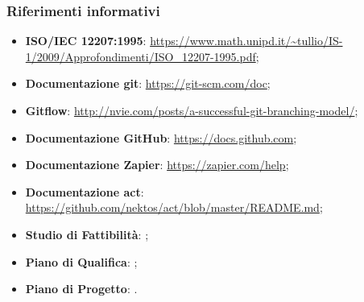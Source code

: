 	\subsubsection{Riferimenti informativi}
	\begin{itemize}
		\item \textbf{ISO/IEC 12207:1995}: \url{https://www.math.unipd.it/~tullio/IS-1/2009/Approfondimenti/ISO_12207-1995.pdf};
		\item \textbf{Documentazione git}: \url{https://git-scm.com/doc};
		\item \textbf{Gitflow}: \url{http://nvie.com/posts/a-successful-git-branching-model/};
		\item \textbf{Documentazione GitHub}: \url{https://docs.github.com};
		\item \textbf{Documentazione Zapier}: \url{https://zapier.com/help};
		\item \textbf{Documentazione act}: \url{https://github.com/nektos/act/blob/master/README.md};
		\item \textbf{Studio di Fattibilità}: ; %
		\item \textbf{Piano di Qualifica}: ;
		\item \textbf{Piano di Progetto}: .
	\end{itemize}